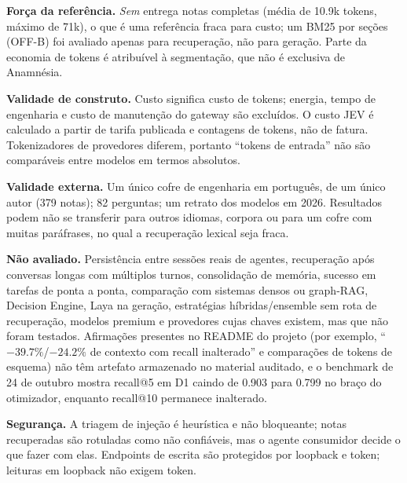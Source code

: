 \documentclass[conference,onecolumn,11pt]{IEEEtran}
\newcommand{\anam}{Anam\-n\'esia}
\begin{document}
\textbf{Força da referência.} \emph{Sem} entrega notas completas (média de 10.9k tokens, máximo de 71k), o que é uma referência fraca para custo; um BM25 por seções (OFF-B) foi avaliado apenas para recuperação, não para geração. Parte da economia de tokens é atribuível à segmentação, que não é exclusiva de \anam{}.

\textbf{Validade de construto.} Custo significa custo de tokens; energia, tempo de engenharia e custo de manutenção do gateway são excluídos. O custo JEV é calculado a partir de tarifa publicada e contagens de tokens, não de fatura. Tokenizadores de provedores diferem, portanto ``tokens de entrada'' não são comparáveis entre modelos em termos absolutos.

\textbf{Validade externa.} Um único cofre de engenharia em português, de um único autor (379 notas); 82 perguntas; um retrato dos modelos em 2026. Resultados podem não se transferir para outros idiomas, corpora ou para um cofre com muitas paráfrases, no qual a recuperação lexical seja fraca.

\textbf{Não avaliado.} Persistência entre sessões reais de agentes, recuperação após conversas longas com múltiplos turnos, consolidação de memória, sucesso em tarefas de ponta a ponta, comparação com sistemas densos ou graph-RAG, Decision Engine, Laya na geração, estratégias híbridas/ensemble sem rota de recuperação, modelos premium e provedores cujas chaves existem, mas que não foram testados. Afirmações presentes no README do projeto (por exemplo, ``$-39.7\%$/$-24.2\%$ de contexto com recall inalterado'' e comparações de tokens de esquema) não têm artefato armazenado no material auditado, e o benchmark de 24 de outubro mostra recall@5 em D1 caindo de 0.903 para 0.799 no braço do otimizador, enquanto recall@10 permanece inalterado.

\textbf{Segurança.} A triagem de injeção é heurística e não bloqueante; notas recuperadas são rotuladas como não confiáveis, mas o agente consumidor decide o que fazer com elas. Endpoints de escrita são protegidos por loopback e token; leituras em loopback não exigem token.

\end{document}
